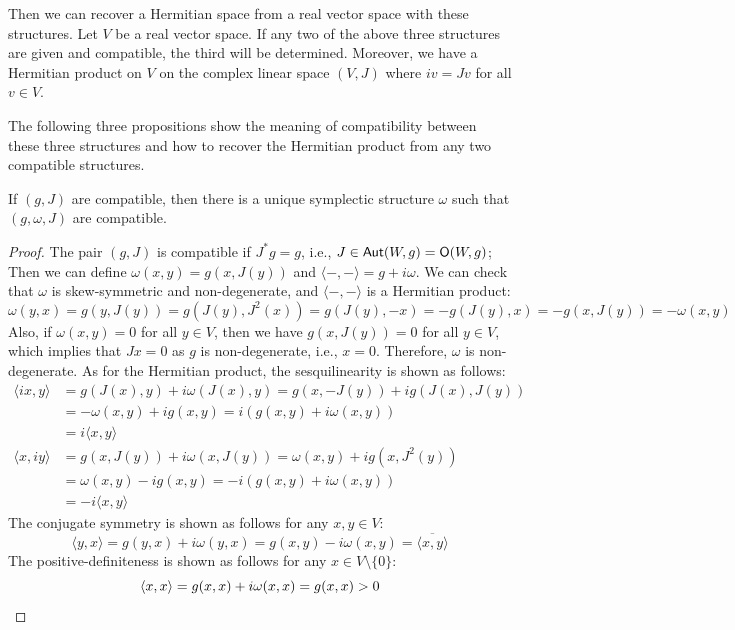 Then we can recover a Hermitian space from a real vector space with these structures. Let $V$ be a real vector space. If any two of the above three structures are given and compatible, the third will be determined. Moreover, we have a Hermitian product on $V$ on the complex linear space $(V, J)$ where $i v = J v$ for all $v \in V$.

The following three propositions show the meaning of compatibility between these three structures and how to recover the Hermitian product from any two compatible structures.

\begin{proposition}
	If $(g, J)$ are compatible, then there is a unique symplectic structure $\omega$ such that $(g, \omega, J)$ are compatible.
\end{proposition}
\begin{proof}
	The pair $(g, J)$ is compatible if $J^* g = g$, i.e., $J \in \operatorname{\text{\normalfont\sffamily Aut}}(W, g) = \operatorname{\text{\normalfont\sffamily O}}(W, g)$; Then we can define $\omega (x, y) = g(x, J(y))$ and $\langle -, - \rangle = g + i \omega$. We can check that $\omega$ is skew-symmetric and non-degenerate, and $\langle -, - \rangle$ is a Hermitian product:
	\[
		\omega (y, x) = g(y, J(y)) = g(J(y), J^2(x)) = g(J(y), -x) = -g(J(y), x) = -g(x, J(y)) = -\omega (x, y)
	\]
	Also, if $\omega (x, y) = 0$ for all $y \in V$, then we have $g(x, J(y)) = 0$ for all $y \in V$, which implies that $J x = 0$ as $g$ is non-degenerate, i.e., $x = 0$. Therefore, $\omega$ is non-degenerate. As for the Hermitian product, the sesquilinearity is shown as follows:
	\begin{align*}
		\langle ix, y \rangle & = g(J(x), y) + i \omega (J(x), y) = g(x, - J(y)) + i g(J(x), J(y)) \\
		                      & = - \omega (x, y) + i g(x, y) = i (g(x, y) + i \omega (x, y))      \\
		                      & = i \langle x, y \rangle                                           \\
		\langle x, iy \rangle & = g(x, J(y)) + i \omega (x, J(y)) = \omega (x, y) + i g(x, J^2(y)) \\
		                      & = \omega (x, y) - i g(x, y) = -i (g(x, y) + i \omega (x, y))       \\
		                      & = -i \langle x, y \rangle
	\end{align*}
	The conjugate symmetry is shown as follows for any $x, y \in V$:
	\[
		\langle y, x \rangle = g(y, x) + i \omega (y, x) = g(x, y) - i \omega (x, y) = \overline{\langle x, y \rangle}
	\]
	The positive-definiteness is shown as follows for any $x \in V \setminus \{ 0 \}$:
	\[
		\langle x, x \rangle = g(x, x) + i \omega (x, x) = g(x, x) > 0 \qedhere
	\]
\end{proof}

